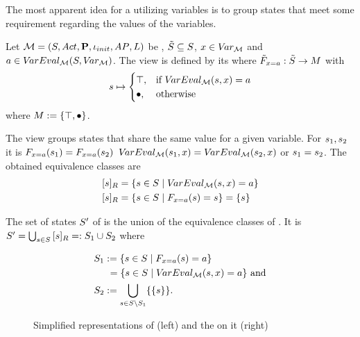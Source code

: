 \documentclass[preview]{standalone}
\begin{document}
The most apparent idea for a \viewN utilizing variables is to group states that meet some requirement regarding the values of the variables.



\begin{definition}
	Let ${{{\mathcal{M}}}} = {{({S}, {Act}, {\textbf{P}}, {\iota_{init}}, {AP}, {L})}}$ be \achgphN, ${\tilde{{S}}} \subseteq {S}$, ${x} \in {V\!ar_{\ensuremath{{{\mathcal{M}}}}}}$ and $\varval \in \varevalimg$. The view \viewparamvalueseq is defined by its \grpfctN where ${{\tilde{F}_{{{x} = {a}}}}} : {\tilde{{S}}} \to {\ensuremath{{M}}}$ with
	\[
	{s} \mapsto
	\begin{cases}
			{\top}, &\text{if } {V\!arEval_{\ensuremath{{{\mathcal{M}}}}}}({s}, {x}) = {a}\\
			{\bullet}, &\text{otherwise}
		\end{cases}
	\]
	where ${{M}} := {\{{\top}, {\bullet}\}}$.
\end{definition}

The view \viewparamvalueseq groups states that share the same value for a given variable. For ${s}_1, {s}_2$ it is ${{F_{{{x} = {a}}}}}({s}_1) = {{F_{{{x} = {a}}}}}({s}_2)$ \iffN ${V\!arEval_{{{\mathcal{M}}}}}({s}_1, {x}) = {V\!arEval_{{{\mathcal{M}}}}}({s}_2, {x})$ or ${s}_1 = {s}_2$. The obtained equivalence classes are
\begin{align*}
	{\ensuremath{{[{s}]_{{R}}}}} &= \{{s} \in {S} \mid {V\!arEval_{\ensuremath{{{\mathcal{M}}}}}}({s}, {x}) = {a}\} \\
	{{[{s}]_{{R}}}} &= \{{s} \in {S} \mid {\ensuremath{{F_{{{x} = {a}}}}}}({s}) = {s}\} = \{{s}\}
\end{align*}

The set of states ${S}'$ of \viewparamvalueseq is the union of the equivalence classes of \eqrelview. It is ${S}' = \bigcup_{{s} \in {S}} {{[{s}]_{{R}}}} =: {S}_1 \cup {S}_2$ where

\begin{align*}
	{S}_1 &:= \{{s} \in {S} \mid {\ensuremath{{F_{{{x} = {a}}}}}}({s}) = {a}\} \\
	&\hspace{1.15mm}= \{{s} \in {S}  \mid {V\!arEval_{\ensuremath{{{\mathcal{M}}}}}}({s}, {x}) = {a}\} \text{ and} \\
	{S}_2 &:= {\bigcup_{{s} \in {S} \setminus {S}_1}\{\{{s}\}\}}.
\end{align*}

\begin{figure}[h]
	\begin{minipage}{.6\textwidth}
		
	\end{minipage}%
	\begin{minipage}{.5\textwidth}
		
	\end{minipage}
	\caption{Simplified representations of \mdp (left) and the \viewN \viewdistance on it (right)}
	\label{fig:varsValEq}  
\end{figure}
\end{document}
